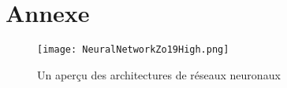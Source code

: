\chapter*{Annexe}
\thispagestyle{plain}



  
  \begin{figure}
  \centering    \texttt{[image: NeuralNetworkZo19High.png]}
  \caption{Un aperçu des architectures de réseaux neuronaux\cite{leijnen2020neural}}
  \label{fig:NN_architectures}
  \end{figure}